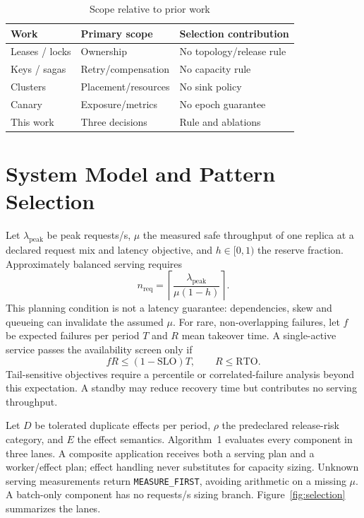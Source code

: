 \documentclass[conference,10pt]{IEEEtran}
\begin{document}
\begin{table}[t]
\caption{Scope relative to prior work}\label{tab:related}
\centering\scriptsize
\begin{tabularx}{\columnwidth}{p{.8in}YY}\toprule
Work & Primary scope & Selection contribution\\\midrule
Leases / locks & Ownership & No topology/release rule\\
Keys / sagas & Retry/compensation & No capacity rule\\
Clusters & Placement/resources & No sink policy\\
Canary & Exposure/metrics & No epoch guarantee\\
This work & Three decisions & Rule and ablations\\\bottomrule
\end{tabularx}
\end{table}

\section{System Model and Pattern Selection}
Let $\lambda_{\mathrm{peak}}$ be peak requests/s, $\mu$ the measured safe throughput of one replica at a declared request mix and latency objective, and $h\in[0,1)$ the reserve fraction. Approximately balanced serving requires
\begin{equation}
n_{\mathrm{req}}=\left\lceil\frac{\lambda_{\mathrm{peak}}}{\mu(1-h)}\right\rceil .\label{eq:capacity}
\end{equation}
This planning condition is not a latency guarantee: dependencies, skew and queueing can invalidate the assumed $\mu$. For rare, non-overlapping failures, let $f$ be expected failures per period $T$ and $R$ mean takeover time. A single-active service passes the availability screen only if
\begin{equation}
fR\leq(1-\mathrm{SLO})T,\qquad R\leq\mathrm{RTO}.\label{eq:budget}
\end{equation}
Tail-sensitive objectives require a percentile or correlated-failure analysis beyond this expectation. A standby may reduce recovery time but contributes no serving throughput.

Let $D$ be tolerated duplicate effects per period, $\rho$ the predeclared release-risk category, and $E$ the effect semantics. Algorithm~1 evaluates every component in three lanes. A composite application receives both a serving plan and a worker/effect plan; effect handling never substitutes for capacity sizing. Unknown serving measurements return \texttt{MEASURE\_FIRST}, avoiding arithmetic on a missing $\mu$. A batch-only component has no requests/s sizing branch. Figure~\ref{fig:selection} summarizes the lanes.
\end{document}
